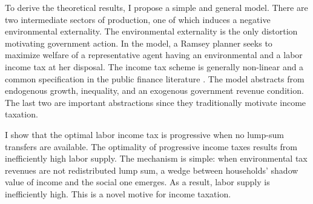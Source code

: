 To derive the theoretical results, I propose a simple and general model. There are two intermediate sectors of production, one of which induces a negative environmental externality. The environmental externality is the only distortion motivating government action. In the model, a Ramsey planner seeks to maximize welfare of a representative agent having  an environmental and a labor income tax at her disposal. The income tax scheme is generally non-linear and a common specification in the public finance literature \citep[e.g.][]{Benabou2002TaxEfficiency, Heathcote2017OptimalFramework}.
The model abstracts from  endogenous growth, inequality, and an exogenous government revenue condition. The last two are important abstractions since they traditionally motivate income taxation.

I show that the optimal labor income tax is progressive when no lump-sum transfers are available. 
The optimality of progressive income taxes results from inefficiently high labor supply. The mechanism is simple: when environmental tax revenues are not redistributed lump sum, a wedge between households' shadow value of  income and the social one emerges.  As a result, labor supply is inefficiently high. 
This is a novel motive for income taxation.
  
